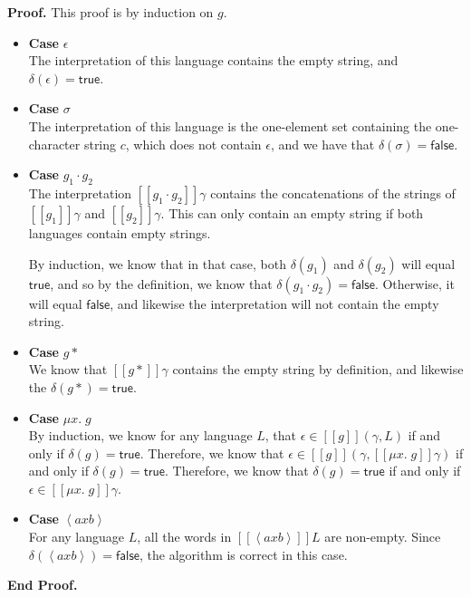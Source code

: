 \documentclass{article}
\newcommand{\fix}[2]{\mu {#1}.\;{#2}}
\newcommand{\lft}[1]{\left<{#1}\right.}
\newcommand{\rgt}[1]{\left.{#1}\right>}
\newcommand{\true}{\mathsf{true}}
\newcommand{\false}{\mathsf{false}}
\newcommand{\interp}[1]{[\![{#1}]\!]}
\newcommand{\emptify}[1]{\delta({#1})}
\newenvironment{proof}{\noindent\textbf{Proof.}}{\noindent\textbf{End Proof.}}
\newenvironment{caseblock}{\begin{itemize}}{\end{itemize}}
\newenvironment{case}[1]{\item \textbf{Case} {#1}\\}{}
\begin{document}
\begin{proof}
This proof is by induction on $g$. 
\begin{caseblock}
  \begin{case}{$\epsilon$}
    The interpretation of this language contains the empty string, and $\emptify{\epsilon} = \true$. 
  \end{case}

  \begin{case}{$\sigma$}
    The interpretation of this language is the one-element set containing the one-character string $c$, 
    which does not contain $\epsilon$, and we have that $\emptify{\sigma} = \false$. 
  \end{case}

  \begin{case}{$g_1\cdot g_2$}
    The interpretation $\interp{g_1\cdot g_2}\gamma$ contains the concatenations of the strings of
    $\interp{g_1}\gamma$ and $\interp{g_2}\gamma$. This can only contain an empty string if both 
    languages contain empty strings. 

    By induction, we know that in that case, both $\emptify{g_1}$ and $\emptify{g_2}$ will equal $\true$, 
    and so by the definition, we know that $\emptify{g_1\cdot g_2} = \false$. Otherwise, it will equal
    $\false$, and likewise the interpretation will not contain the empty string.
  \end{case}

  \begin{case}{$g*$}
    We know that $\interp{g*}\gamma$ contains the empty string by definition, and likewise the 
    $\emptify{g*} = \true$. 
  \end{case}

  \begin{case}{$\fix{x}{g}$}
    By induction, we know for any language $L$, that $\epsilon \in \interp{g}(\gamma, L)$  if and 
    only if $\emptify{g} = \true$. Therefore, we know that 
    $\epsilon \in \interp{g}(\gamma, \interp{\fix{x}{g}}\gamma)$ if and only if $\emptify{g} = \true$. 
    Therefore, we know that $\emptify{g} = \true$ if and only if $\epsilon \in \interp{\fix{x}{g}}\gamma$. 
  \end{case}

  \begin{case}{$\lft{a}x\rgt{b}$}
    For any language $L$, all the words in $\interp{\lft{a}x\rgt{b}}L$ are non-empty. 
    Since $\emptify{\lft{a}x\rgt{b}} = \false$, the algorithm is correct in this case. 
  \end{case}


\end{caseblock}
\end{proof}
\end{document}

